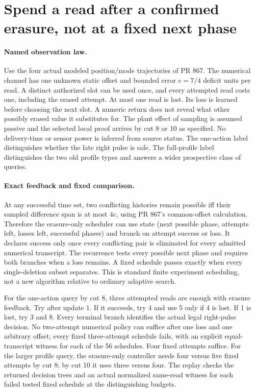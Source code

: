 \documentclass{article}
\begin{document}
\section*{Spend a read after a confirmed erasure, not at a fixed next phase}
\paragraph{Named observation law.}
Use the four actual modeled position/mode trajectories of PR 867.
The numerical channel has one unknown static offset and bounded
error $e=7/4$ deficit units per read. A distinct authorized slot
can be used once, and every attempted read costs one, including
the erased attempt. At most one read is lost. Its loss is learned
before choosing the next slot. A numeric return does not reveal
what other possibly erased value it substitutes for. The plant
effect of sampling is assumed passive and the selected local
proof arrives by cut 8 or 10 as specified. No delivery-time or
sensor power is inferred from source status.
The one-action label distinguishes whether the late right pulse
is safe. The full-profile label distinguishes the two old profile
types and answers a wider prospective class of queries.

\paragraph{Exact feedback and fixed comparison.}
At any successful time set, two conflicting histories remain
possible iff their sampled difference span is at most $4e$,
using PR 867's common-offset calculation. Therefore the
erasure-only scheduler can use state (next possible phase,
attempts left, losses left, successful phases) and branch on
attempt success or loss. It declares success only once every
conflicting pair is eliminated for every admitted numerical
transcript. The recurrence tests every possible next phase and
requires both branches when a loss remains. A fixed schedule
passes exactly when every single-deletion subset separates.
This is standard finite experiment scheduling, not a new
algorithm relative to ordinary adaptive search.

For the one-action query by cut 8, three attempted reads are
enough with erasure feedback. Try after update 1. If it succeeds,
try 4 and use 5 only if 4 is lost. If 1 is lost, try 3 and 8.
Every terminal branch identifies the actual legal right-pulse
decision. No two-attempt numerical policy can suffice after
one loss and one arbitrary offset; every fixed three-attempt
schedule fails, with an explicit equal-transcript witness for
each of the 56 schedules. Four fixed attempts suffice.
For the larger profile query, the erasure-only controller needs
four versus five fixed attempts by cut 8; by cut 10 it uses
three versus four. The replay checks the returned decision
trees and an actual normalized same-read witness for each
failed tested fixed schedule at the distinguishing budgets.
\end{document}
